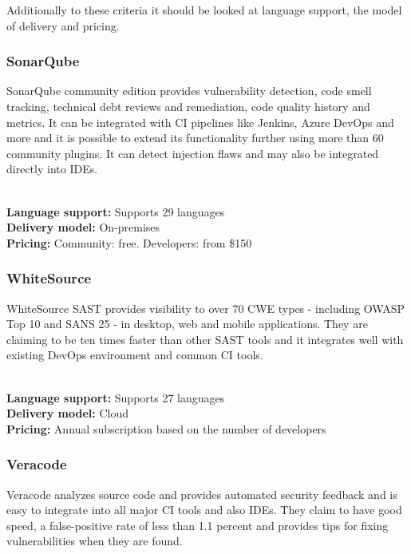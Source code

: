 \documentclass[conference]{IEEEtran}
\begin{document}
Additionally to these criteria it should be looked at language support, the model of delivery and pricing.\\

\noindent
\subsubsection{SonarQube \cite{sast1}}

SonarQube community edition provides vulnerability detection, code smell tracking, technical debt reviews and remediation, code quality history and metrics. It can be integrated with CI pipelines like Jenkins, Azure DevOps and more and it is possible to extend its functionality further using more than 60 community plugins. It can detect injection flaws and may also be integrated directly into IDEs. 

\noindent\\
\textbf{Language support:} Supports 29 languages
\noindent\\
\textbf{Delivery model:} On-premises
\noindent\\
\textbf{Pricing:} Community: free. Developers: from \$150
\\

\noindent
\subsubsection{WhiteSource \cite{sast2}}

WhiteSource SAST provides visibility to over 70 CWE types - including OWASP Top 10 and SANS 25 - in desktop, web and mobile applications. They are claiming to be ten times faster than other SAST tools and it integrates well with existing DevOps environment and common CI tools.

\noindent\\
\textbf{Language support:} Supports 27 languages
\noindent\\
\textbf{Delivery model:} Cloud
\noindent\\
\textbf{Pricing:} Annual subscription based on the number of developers
\\

\noindent
\subsubsection{Veracode \cite{sast3}}

Veracode analyzes source code and provides automated security feedback and is easy to integrate into all major CI tools and also IDEs. They claim to have good speed, a false-positive rate of less than 1.1 percent and provides tips for fixing vulnerabilities when they are found.
\end{document}
